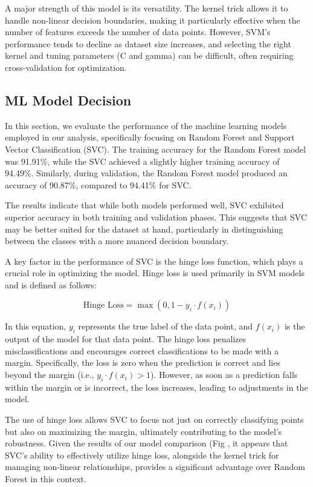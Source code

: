 \documentclass{article}
\begin{document}
A major strength of this model is its versatility. The kernel trick allows it to handle non-linear decision boundaries, making it particularly effective when the number of features exceeds the number of data points. However, SVM's performance tends to decline as dataset size increases, and selecting the right kernel and tuning parameters (C and gamma) can be difficult, often requiring cross-validation for optimization.

\subsection{ML Model Decision}

In this section, we evaluate the performance of the machine learning models employed in our analysis, specifically focusing on Random Forest and Support Vector Classification (SVC). The training accuracy for the Random Forest model was 91.91\%, while the SVC achieved a slightly higher training accuracy of 94.49\%. Similarly, during validation, the Random Forest model produced an accuracy of 90.87\%, compared to 94.41\% for SVC. 

The results indicate that while both models performed well, SVC exhibited superior accuracy in both training and validation phases. This suggests that SVC may be better suited for the dataset at hand, particularly in distinguishing between the classes with a more nuanced decision boundary.

A key factor in the performance of SVC is the hinge loss function, which plays a crucial role in optimizing the model. Hinge loss is used primarily in SVM models and is defined as follows:

\[
\text{Hinge Loss} = \max(0, 1 - y_i \cdot f(x_i))
\]

In this equation, \(y_i\) represents the true label of the data point, and \(f(x_i)\) is the output of the model for that data point. The hinge loss penalizes misclassifications and encourages correct classifications to be made with a margin. Specifically, the loss is zero when the prediction is correct and lies beyond the margin (i.e., \(y_i \cdot f(x_i) > 1\)). However, as soon as a prediction falls within the margin or is incorrect, the loss increases, leading to adjustments in the model.

The use of hinge loss allows SVC to focus not just on correctly classifying points but also on maximizing the margin, ultimately contributing to the model’s robustness. Given the results of our model comparison (Fig , it appears that SVC's ability to effectively utilize hinge loss, alongside the kernel trick for managing non-linear relationships, provides a significant advantage over Random Forest in this context.
\end{document}
